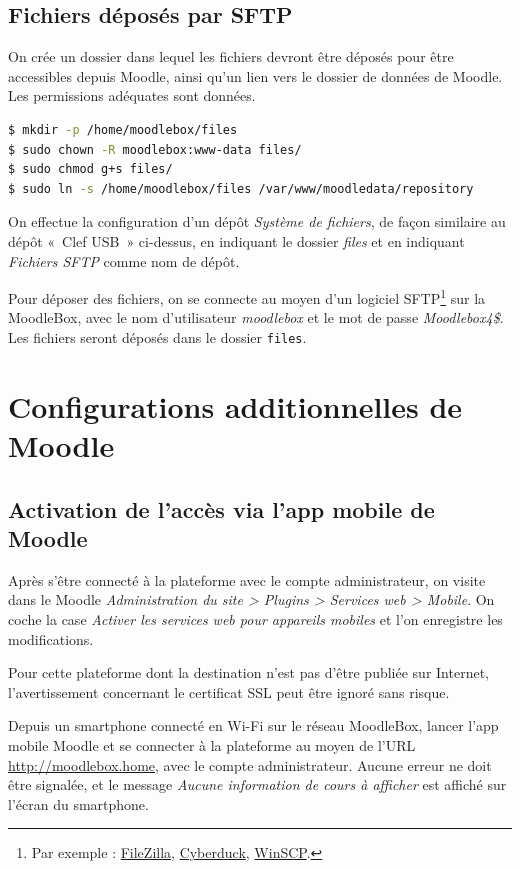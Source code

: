 \documentclass[11pt]{article}
\begin{document}
\subsection{Fichiers déposés par SFTP}

On crée un dossier dans lequel les fichiers devront être déposés pour être accessibles depuis Moodle, ainsi qu'un lien vers le dossier de données de Moodle. Les permissions adéquates sont données.

\begin{lstlisting}[language=bash]
$ mkdir -p /home/moodlebox/files
$ sudo chown -R moodlebox:www-data files/
$ sudo chmod g+s files/
$ sudo ln -s /home/moodlebox/files /var/www/moodledata/repository
\end{lstlisting}

On effectue la configuration d'un dépôt \emph{Système de fichiers}, de façon similaire au dépôt « Clef USB » ci-dessus, en indiquant le dossier \emph{files} et en indiquant \emph{Fichiers SFTP} comme nom de dépôt.

Pour déposer des fichiers, on se connecte au moyen d'un logiciel SFTP\footnote{Par exemple : \href{https://filezilla-project.org/}{FileZilla}, \href{https://cyberduck.io/}{Cyberduck}, \href{http://winscp.net/}{WinSCP}.} sur la MoodleBox, avec le nom d'utilisateur \emph{moodlebox} et le mot de passe \emph{Moodlebox4\$}. Les fichiers seront déposés dans le dossier \lstinline{files}.

\section{Configurations additionnelles de Moodle}

\subsection{Activation de l'accès via l'app mobile de Moodle}

Après s'être connecté à la plateforme avec le compte administrateur,  on visite dans le Moodle \emph{Administration du site > Plugins > Services web > Mobile}. On coche la case \emph{Activer les services web pour appareils mobiles} et l'on enregistre les modifications.

Pour cette plateforme dont la destination n'est pas d'être publiée sur Internet, l'avertissement concernant le certificat SSL peut être ignoré sans risque.

\begin{verification}
Depuis un smartphone connecté en Wi-Fi sur le réseau MoodleBox, lancer l'app mobile Moodle et se connecter à la plateforme au moyen de l'URL \url{http://moodlebox.home}, avec le compte administrateur. Aucune erreur ne doit être signalée, et le message \emph{Aucune information de cours à afficher} est affiché sur l'écran du smartphone.
\end{verification}
\end{document}
